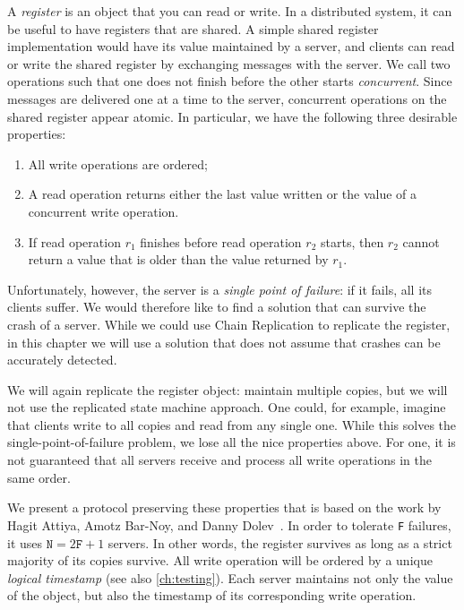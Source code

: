 \documentclass{report}
\begin{document}
{A \emph{register} is an object that you can read or write.  In a distributed
system, it can be useful to have registers that are shared.
A simple shared register implementation
would have its value maintained by a server, and clients can read or write the
shared register by exchanging messages with the server.
We call two operations such that one does not finish before the other starts
\emph{concurrent}.
Since messages are delivered one at a time to the server,
concurrent operations on the shared register appear atomic.
In particular, we have the following three desirable properties:
\begin{enumerate}
\item All write operations are ordered;
\item A read operation returns either the last value written or the value of
a concurrent write operation.
\item If read operation $r_1$ finishes before read operation $r_2$ starts,
then $r_2$ cannot return a value that is older than the value returned
by $r_1$.
\end{enumerate}

%
Unfortunately, however, the server is a \emph{single point of failure}:
if it fails, all its clients suffer.
We would therefore like to find a solution that can survive the crash
of a server.
While we could use Chain Replication to replicate the register, in
this chapter we will use a solution that does not assume that
crashes can be accurately detected.

We will again replicate the register object: maintain multiple copies,
but we will not use the replicated state machine approach.
One could, for example, imagine that clients write to all copies and read
from any single one.
While this solves the single-point-of-failure problem, we lose all the
nice properties above.  For one, it is not guaranteed that all servers
receive and process all write operations in the same order.

%
We present a protocol preserving these properties that is based on the
work by Hagit Attiya, Amotz Bar-Noy, and Danny Dolev~\cite{ABD95}.
In order to tolerate \texttt{F} failures,
it uses $\mathtt{N} = 2\mathtt{F} + 1$ servers.
In other words, the register survives as long as a strict majority of
its copies survive.
All write operation will be ordered by a unique \emph{logical timestamp}
(see also \autoref{ch:testing}).
Each server maintains not only the value of the object, but also the
timestamp of its corresponding write operation.

}
\end{document}
